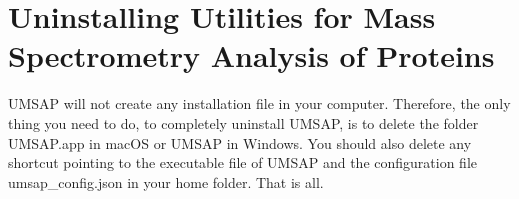 \section{Uninstalling Utilities for Mass Spectrometry Analysis of Proteins}

UMSAP will not create any installation file in your computer. Therefore, the only
thing you need to do, to completely uninstall UMSAP, is to delete the folder
UMSAP.app in macOS or UMSAP in Windows. You should also delete any shortcut
pointing to the executable file of UMSAP and the configuration file
umsap\_config.json in your home folder. That is all.